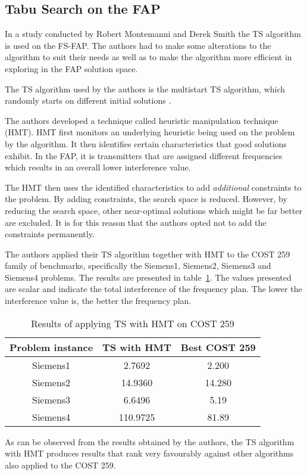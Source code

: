 \subsection{Tabu Search on the FAP}
In a study conducted by Robert Montemanni and Derek Smith \cite{TabuMontemanniSmith} the TS algorithm is used on the FS-FAP. The authors had to make some alterations to the algorithm to suit their needs as well as to make the algorithm more efficient in exploring in the FAP solution space.

The TS algorithm used by the authors is the multistart TS algorithm, which randomly starts on different initial solutions \cite{TabuMontemanniSmith}.

The authors developed a technique called heuristic manipulation technique (HMT). HMT first monitors an underlying heuristic being used on the problem by the algorithm\cite{TabuMontemanniSmith}. It then identifies certain characteristics that good solutions exhibit. In the FAP, it is transmitters that are assigned different frequencies which results in an overall lower interference value\cite{TabuMontemanniSmith}.

The HMT then uses the identified characteristics to add \emph{additional} constraints to the problem\cite{TabuMontemanniSmith}. By adding constraints, the search space is reduced. However, by reducing the search space, other near-optimal solutions which might be far better are excluded\cite{TabuMontemanniSmith}. It is for this reason that the authors opted not to add the constraints permanently.

The authors applied their TS algorithm together with HMT to the COST 259 family of benchmarks, specifically the Siemens1, Siemens2, Siemens3 and Siemens4 problems. The results are presented in table~\ref{TSCOST259}. The values presented are scalar and indicate the total interference of the frequency plan. The lower the interference value is, the better the frequency plan.
\begin{table}[H]
\centering
	\begin{tabular}{| c | c | c |}
		\hline
		Problem instance & TS with HMT & Best COST 259 \\ \hline
		Siemens1 & 2.7692 & 2.200 \\ \hline
		Siemens2 & 14.9360 & 14.280 \\ \hline
		Siemens3 & 6.6496 & 5.19 \\ \hline
		Siemens4 & 110.9725 & 81.89 \\ \hline
	\end{tabular}
\caption{Results of applying TS with HMT on COST 259}
\label{TSCOST259}
\end{table}
As can be observed from the results obtained by the authors, the TS algorithm with HMT produces results that rank very favourably against other algorithms also applied to the COST 259.

